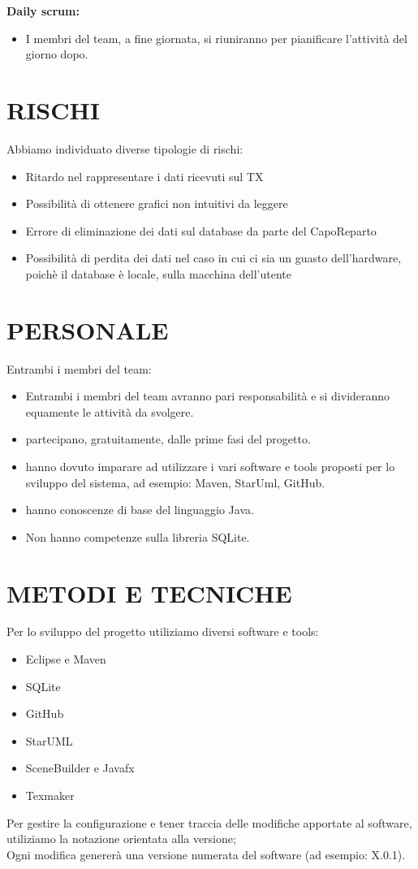 \documentclass{report}
\begin{document}
\textbf{Daily scrum:}\\
\begin{itemize}
\item I membri del team, a fine giornata, si riuniranno per pianificare l'attività del giorno dopo.
\end{itemize}


\chapter{RISCHI}
Abbiamo individuato diverse tipologie di rischi:
\begin{itemize}
\item Ritardo nel rappresentare i dati ricevuti sul TX
\item Possibilità di ottenere grafici non intuitivi da leggere
\item Errore di eliminazione dei dati sul database da parte del CapoReparto
\item Possibilità di perdita dei dati nel caso in cui ci sia un guasto dell'hardware, poichè il database è locale, sulla macchina dell'utente
\end{itemize}

\begingroup
\let\clearpage\relax
\chapter{PERSONALE}
\endgroup
Entrambi i membri del team:
\begin{itemize}
\item Entrambi i membri del team avranno pari responsabilità e si divideranno equamente le attività da svolgere.
\item partecipano, gratuitamente, dalle prime fasi del progetto.
\item hanno dovuto imparare ad utilizzare i vari software e tools proposti per lo sviluppo del sistema, ad esempio:
 Maven, StarUml, GitHub.
\item hanno conoscenze di base del linguaggio Java.
\item Non hanno competenze sulla libreria SQLite.
\end{itemize}

\chapter{METODI E TECNICHE}
Per lo sviluppo del progetto utiliziamo diversi software e tools:
\begin{itemize}
\item Eclipse e Maven
\item SQLite
\item GitHub
\item StarUML
\item SceneBuilder e Javafx
\item Texmaker
\end{itemize}
Per gestire la configurazione e tener traccia delle modifiche apportate al software, utiliziamo la notazione orientata alla versione;\\
Ogni modifica genererà una versione numerata del software (ad esempio: X.0.1).
\end{document}
